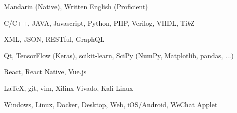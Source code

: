 
\begin{cvtbl}
        {Mandarin (Native), Written English (Proficient)}%

        {C/C++, JAVA, Javascript, Python, PHP, Verilog, VHDL, Ti\textit{k}Z}

        {XML, JSON, RESTful, GraphQL}

        {Qt, TensorFlow (Keras), scikit-learn, SciPy (NumPy, Matplotlib, pandas, ...)}

        {React, React Native, Vue.js}

        {\LaTeX, git, vim, Xilinx Vivado, Kali Linux}

        {Windows, Linux, Docker, Desktop, Web, iOS/Android, WeChat Applet}
\end{cvtbl}

\endinput